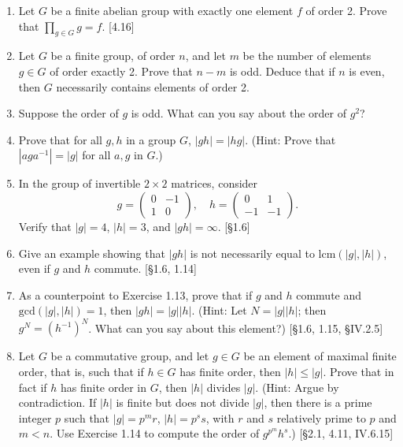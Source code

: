 \begin{enumerate}
    \item Let $G$ be a finite abelian group with exactly one element $f$ of order 2. Prove that $\prod_{g \in G} g = f$. [4.16]

    \item Let $G$ be a finite group, of order $n$, and let $m$ be the number of elements $g \in G$ of order exactly 2. Prove that $n-m$ is odd. Deduce that if $n$ is even, then $G$ necessarily contains elements of order 2.

    \item Suppose the order of $g$ is odd. What can you say about the order of $g^2$?

    \item Prove that for all $g, h$ in a group $G$, $|gh| = |hg|$. (Hint: Prove that $|aga^{-1}| = |g|$ for all $a, g$ in $G$.)

    \item In the group of invertible $2 \times 2$ matrices, consider
          \[
              g = \begin{pmatrix} 0 & -1 \\ 1 & 0 \end{pmatrix}, \quad h = \begin{pmatrix} 0 & 1 \\ -1 & -1 \end{pmatrix}.
          \]
          Verify that $|g|=4$, $|h|=3$, and $|gh|=\infty$. [\S1.6]

    \item Give an example showing that $|gh|$ is not necessarily equal to $\text{lcm}(|g|,|h|)$, even if $g$ and $h$ commute. [\S1.6, 1.14]

    \item As a counterpoint to Exercise 1.13, prove that if $g$ and $h$ commute and $\text{gcd}(|g|, |h|) = 1$, then $|gh| = |g||h|$. (Hint: Let $N = |g||h|$; then $g^N = (h^{-1})^N$. What can you say about this element?) [\S1.6, 1.15, \S IV.2.5]

    \item Let $G$ be a commutative group, and let $g \in G$ be an element of maximal finite order, that is, such that if $h \in G$ has finite order, then $|h| \le |g|$. Prove that in fact if $h$ has finite order in $G$, then $|h|$ divides $|g|$. (Hint: Argue by contradiction. If $|h|$ is finite but does not divide $|g|$, then there is a prime integer $p$ such that $|g| = p^m r$, $|h| = p^s s$, with $r$ and $s$ relatively prime to $p$ and $m < n$. Use Exercise 1.14 to compute the order of $g^{p^m} h^s$.) [\S2.1, 4.11, IV.6.15]
\end{enumerate}